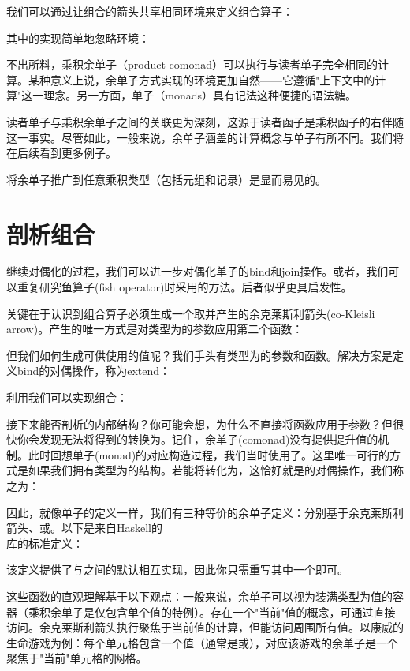 我们可以通过让组合的箭头共享相同环境来定义组合算子：

其中的实现简单地忽略环境：

不出所料，乘积余单子（product comonad）可以执行与读者单子完全相同的计算。某种意义上说，余单子方式实现的环境更加自然——它遵循"上下文中的计算"这一理念。另一方面，单子（monads）具有记法这种便捷的语法糖。

读者单子与乘积余单子之间的关联更为深刻，这源于读者函子是乘积函子的右伴随这一事实。尽管如此，一般来说，余单子涵盖的计算概念与单子有所不同。我们将在后续看到更多例子。

将余单子推广到任意乘积类型（包括元组和记录）是显而易见的。

\section{剖析组合}

继续对偶化的过程，我们可以进一步对偶化单子的bind和join操作。或者，我们可以重复研究鱼算子(fish operator)时采用的方法。后者似乎更具启发性。

关键在于认识到组合算子必须生成一个取并产生的余克莱斯利箭头(co-Kleisli arrow)。产生的唯一方式是对类型为的参数应用第二个函数：

但我们如何生成可供使用的值呢？我们手头有类型为的参数和函数。解决方案是定义bind的对偶操作，称为extend：

利用我们可以实现组合：

接下来能否剖析的内部结构？你可能会想，为什么不直接将函数应用于参数？但很快你会发现无法将得到的转换为。记住，余单子(comonad)没有提供提升值的机制。此时回想单子(monad)的对应构造过程，我们当时使用了。这里唯一可行的方式是如果我们拥有类型为的结构。若能将转化为，这恰好就是的对偶操作，我们称之为：

因此，就像单子的定义一样，我们有三种等价的余单子定义：分别基于余克莱斯利箭头、或。以下是来自Haskell的\\ 库的标准定义：

该定义提供了与之间的默认相互实现，因此你只需重写其中一个即可。

这些函数的直观理解基于以下观点：一般来说，余单子可以视为装满类型为值的容器（乘积余单子是仅包含单个值的特例）。存在一个"当前"值的概念，可通过直接访问。余克莱斯利箭头执行聚焦于当前值的计算，但能访问周围所有值。以康威的生命游戏为例：每个单元格包含一个值（通常是或），对应该游戏的余单子是一个聚焦于"当前"单元格的网格。

